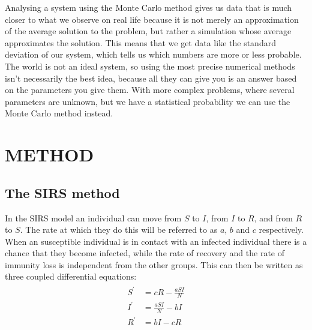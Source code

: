 \documentclass[a4paper]{article}
\let\Oldsection\section
\renewcommand{\section}{\FloatBarrier\Oldsection}
\let\Oldsubsection\subsection
\renewcommand{\subsection}{\FloatBarrier\Oldsubsection}
\begin{document}
	Analysing a system using the Monte Carlo method gives us data that is much closer to what we observe on real life because it is not merely an approximation of the average solution to the problem, but rather a simulation whose average approximates the solution. This means that we get data like the standard deviation of our system, which tells us which numbers are more or less probable. The world is not an ideal system, so using the most precise numerical methods isn't necessarily the best idea, because all they can give you is an answer based on the parameters you give them. With more complex problems, where several parameters are unknown, but we have a statistical probability we can use the Monte Carlo method instead.
	
	\section{METHOD}
	
	
	\subsection{The SIRS method}
	
	In the SIRS model an individual can move from $S$ to $I$, from $I$ to $R$, and from $R$ to $S$. The rate at which they do this will be referred to as $a$, $b$ and $c$ respectively. When an susceptible individual is in contact with an infected individual there is a chance that they become infected, while the rate of recovery and the rate of immunity loss is independent from the other groups. This can then be written as three coupled differential equations:
	\begin{align}
	\begin{split}
	S ^ { \prime } & = c R - \frac { a S I } { N }\\
	I ^ { \prime } & = \frac { a S I } { N } - b I \\
	R ^ { \prime } & = b I - c R \label{SIRS}
	\end{split} 
	\end{align}
	
\end{document}

